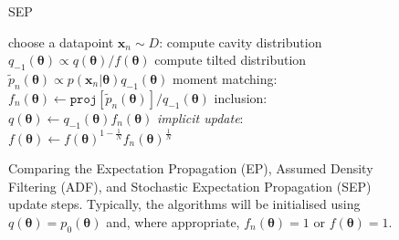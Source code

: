\begin{figure}[!t]
\begin{minipage}[t]{0.33\linewidth}
\begin{algorithm}[H]
\begin{algorithmic}[1]
\end{algorithmic}
\end{algorithm}
\end{minipage}
\begin{minipage}[t]{0.33\linewidth}
\centering
\begin{algorithm}[H]
\caption{SEP} \small
\label{alg:sep} 
\begin{algorithmic}[1] 
	\STATE choose a datapoint $\bm{x}_n\sim D$:
	\STATE compute cavity distribution \\ $q_{-1}(\bm{\theta}) \propto q(\bm{\theta}) / f(\bm{\theta})$
	\STATE compute tilted distribution \\$\tilde{p}_n(\bm{\theta}) \propto p(\bm{x}_n|\bm{\theta}) q_{-1}(\bm{\theta})$
	\STATE moment matching: \\\hspace{-1mm}$f_n(\bm{\theta}) \leftarrow \mathtt{proj}[\tilde{p}_n(\bm{\theta})] / q_{-1}(\bm{\theta}) $
	\STATE inclusion:\\ $q(\bm{\theta}) \leftarrow q_{-1}(\bm{\theta}) f_n(\bm{\theta})$
	\STATE \textit{implicit update}:\\ $f(\bm{\theta}) \leftarrow f(\bm{\theta})^{1 - \frac{1}{N}} f_n(\bm{\theta})^{\frac{1}{N}}$
\end{algorithmic}
\end{algorithm}
\end{minipage} 
%
\caption{Comparing the Expectation Propagation (EP), Assumed Density Filtering (ADF), and Stochastic Expectation Propagation (SEP) update steps. Typically, the algorithms will be initialised using $q(\mathbf{\theta}) = p_0(\mathbf{\theta})$ and, where appropriate, $f_n(\mathbf{\theta})=1$ or $f(\mathbf{\theta})=1$.}
\end{figure}

%
%
